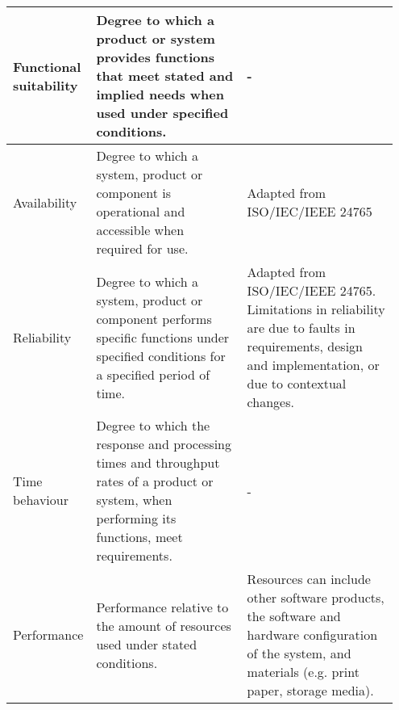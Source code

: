 \begin{center}
    \tabletail{\hline}
    \tablelasttail{\hline}
    
    \label{tab:sq_char}
    
    \small
    \begin{supertabular}{|p{0.15\linewidth}|p{0.4\linewidth}|p{0.4\linewidth}|}
    
    \hline
    
    Functional suitability &
    Degree to which a product or system provides functions that meet stated and implied needs when used under specified conditions. &
    -
    \\ \hline
    
    Availability &
    Degree to which a system, product or component is operational and accessible when required for use. &
    Adapted from ISO/IEC/IEEE 24765
    \\ \hline
    
    Reliability &
    Degree to which a system, product or component performs specific functions under specified conditions for a specified period of time. &
    Adapted from ISO/IEC/IEEE 24765. Limitations in reliability are due to faults in requirements, design and implementation, or due to contextual changes.
    \\ \hline
    
    Time behaviour &
    Degree to which the response and processing times and throughput rates of a product or system, when performing its functions, meet requirements. &
    -
    \\ \hline
    
    Performance &
    Performance relative to the amount of resources used under stated conditions. &
    Resources can include other software products, the software and hardware configuration of the system, and materials (e.g. print paper, storage media).
    \\ \hline
    

\end{supertabular}
\end{center}
